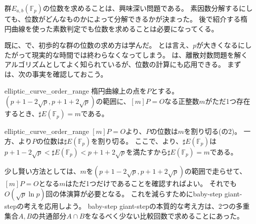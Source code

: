 群$E_{a,b}(\mathbb{F}_p)$の位数を求めることは、興味深い問題である。
素因数分解するにしても、位数がどんなものかによって分解できるかが決まった。
後で紹介する楕円曲線を使った素数判定でも位数を求めることは必要になってくる。

既に、で、初歩的な群の位数の求め方は学んだ。
とは言え、$p$が大きくなるにしたがって現実的な時間では終わらなくなってしまう。
は、離散対数問題を解くアルゴリズムとしてよく知られているが、位数の計算にも応用できる。
まずは、次の事実を確認しておこう。

\begin{Prop}{}{elliptic_curve_order_range}
楕円曲線上の点を$P$とする。
$(p+1-2\sqrt{p}, p+1+2\sqrt{p})$の範囲に、$[m]P=O$なる正整数$m$がただ1つ存在するとき、$\sharp E(\mathbb{F}_{p})=m$である。
\end{Prop}

\begin{prProof}{elliptic_curve_order_range}
$[m]P=O$より、$P$の位数は$m$を割り切る(の2)。
一方、より$P$の位数は$\sharp E(\mathbb{F}_{p})$を割り切る。
ここで、より、$\sharp E(\mathbb{F}_{p})$は$p+1-2\sqrt{p}<\sharp E(\mathbb{F}_{p})<p+1+2\sqrt{p}$を満たすから$\sharp E(\mathbb{F}_{p})=m$である。
\end{prProof}

少し賢い方法としては、$m$を$(p+1-2\sqrt{p}, p+1+2\sqrt{p})$の範囲で走らせて、$[m]P=O$となる$m$はただ1つだけであることを確認すればよい。
それでも$O(\sqrt{p}\ln{p})$回の体演算が必要となる。
これを減らすためにbaby-step giant-stepの考えを応用しよう。
baby-step giant-stepの本質的な考え方は、2つの多重集合$A,B$の共通部分$A\cap B$をなるべく少ない比較回数で求めることにあった。

